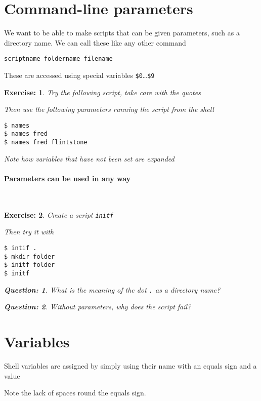 \documentclass[12pt,a4paper]{article}
\newtheorem{exercise}{Exercise:}
\newtheorem{question}{Question:}
\begin{document}
\section{Command-line parameters }
We want to be able to make scripts that can be given parameters, such
as a directory name.  We can call these like any other command
\begin{verbatim}
scriptname foldername filename
\end{verbatim}
These are accessed using special variables
\texttt{\$0}\ldots\texttt{\$9}
\begin{exercise}
  Try the following script, take care with the quotes
  \begin{code}
  
  \end{code}
Then use the following parameters running the script from the shell
\begin{terminal}
\begin{verbatim}
$ names
$ names fred
$ names fred flintstone
\end{verbatim}
\end{terminal}
Note how variables that have not been set are expanded
\end{exercise}

\paragraph{Parameters can be used in any way}~\\
\begin{exercise}Create a script \texttt{initf}
\begin{code}[title=\texttt{inif}]

\end{code}
Then try it with
\begin{terminal}
\begin{verbatim}
$ intif .
$ mkdir folder
$ initf folder
$ initf
\end{verbatim}
\end{terminal}
\begin{question}
  What is the meaning of the dot \texttt{.} as a directory name?
\end{question}
\begin{question}
  Without parameters, why does the script fail?
\end{question}
\end{exercise}

\section{Variables}
Shell variables are assigned by simply using their name with an equals
sign and a value

Note the lack of spaces round the equals sign.
\end{document}
